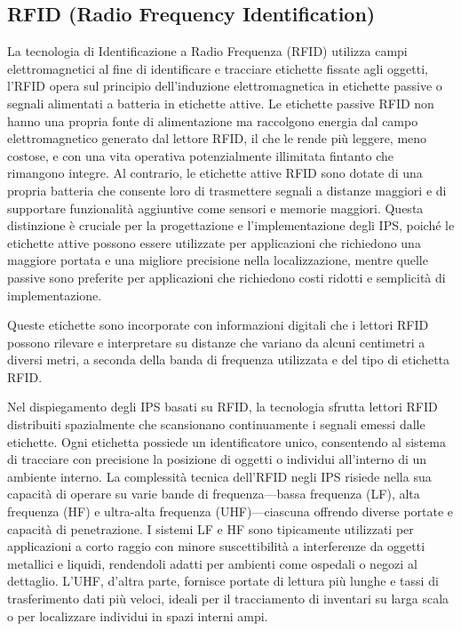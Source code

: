 \subsection{RFID (Radio Frequency Identification)}
\hspace{\parindent}La tecnologia di Identificazione a Radio Frequenza (RFID) utilizza campi elettromagnetici al fine di identificare e tracciare etichette fissate agli oggetti, l'RFID opera sul principio dell'induzione elettromagnetica in etichette passive o segnali alimentati a batteria in etichette attive. Le etichette passive RFID non hanno una propria fonte di alimentazione ma raccolgono energia dal campo elettromagnetico generato dal lettore RFID, il che le rende più leggere, meno costose, e con una vita operativa potenzialmente illimitata fintanto che rimangono integre. Al contrario, le etichette attive RFID sono dotate di una propria batteria che consente loro di trasmettere segnali a distanze maggiori e di supportare funzionalità aggiuntive come sensori e memorie maggiori. Questa distinzione è cruciale per la progettazione e l'implementazione degli IPS, poiché le etichette attive possono essere utilizzate per applicazioni che richiedono una maggiore portata e una migliore precisione nella localizzazione, mentre quelle passive sono preferite per applicazioni che richiedono costi ridotti e semplicità di implementazione.

\noindent Queste etichette sono incorporate con informazioni digitali che i lettori RFID possono rilevare e interpretare su distanze che variano da alcuni centimetri a diversi metri, a seconda della banda di frequenza utilizzata e del tipo di etichetta RFID.

Nel dispiegamento degli IPS basati su RFID, la tecnologia sfrutta lettori RFID distribuiti spazialmente che scansionano continuamente i segnali emessi dalle etichette. Ogni etichetta possiede un identificatore unico, consentendo al sistema di tracciare con precisione la posizione di oggetti o individui all'interno di un ambiente interno. La complessità tecnica dell'RFID negli IPS risiede nella sua capacità di operare su varie bande di frequenza—bassa frequenza (LF), alta frequenza (HF) e ultra-alta frequenza (UHF)—ciascuna offrendo diverse portate e capacità di penetrazione. I sistemi LF e HF sono tipicamente utilizzati per applicazioni a corto raggio con minore suscettibilità a interferenze da oggetti metallici e liquidi, rendendoli adatti per ambienti come ospedali o negozi al dettaglio. L'UHF, d'altra parte, fornisce portate di lettura più lunghe e tassi di trasferimento dati più veloci, ideali per il tracciamento di inventari su larga scala o per localizzare individui in spazi interni ampi.

